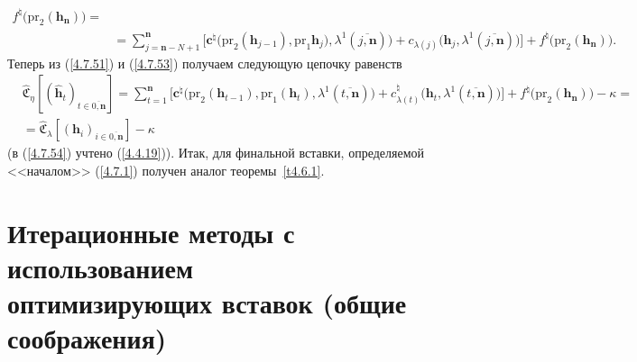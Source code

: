 \documentclass[12pt]{report}
\newcommand{\ov}{\overline}
\newcommand{\la}{\lambda}
\newcommand{\zc}{{\mathbf c}}
\newcommand{\nn}{{\mathbf n}}
\begin{document}
{{\begin{eqnarray}
f^\natural\bigl(\mathrm{pr}_2(\mathbf{h}_\nn)\bigl)=
&\nonumber\\
&= \sum\limits_{j=\nn-N+1}^\nn\bigl[\zc^\natural\bigl(\mathrm{pr}_2(\mathbf{h}_{j-1}),\mathrm{pr}_1
\mathbf{h}_j),\la^1(\ov{j,\nn})\bigl) + c_{\la(j)}\bigl(\mathbf{h}_j,\la^1(\ov{j,\nn})\bigl)\bigl]+
f^\natural\bigl(\mathrm{pr}_2(\mathbf{h}_\nn)\bigl).
&\label{4.7.53}
\end{eqnarray}
Теперь из (\ref{4.7.51}) и (\ref{4.7.53}) получаем следующую цепочку равенств
\begin{eqnarray}
&\widehat{\mathfrak{C}}_\eta[(\hat{\mathbf{h}}_t)_{t\in\ov{0,\nn}}] =
\sum\limits_{t=1}^\nn\bigl[\zc^\natural\bigl(\mathrm{pr}_2(\mathbf{h}_{t-1}),\mathrm{pr}_1
(\mathbf{h}_t),\la^1(\ov{t,\nn})\bigl) + c_{\la(t)}^\natural\bigl(\mathbf{h}_t,
\la^1(\ov{t,\nn})\bigl)\bigl]+ f^\natural\bigl(\mathrm{pr}_2(\mathbf{h}_\nn)\bigl)- \kappa =
&\nonumber\\
&=\widehat{\mathfrak{C}}_\la[(\mathbf{h}_i)_{i\in\ov{0,\nn}}]-\kappa
&\label{4.7.54}
\end{eqnarray}
(в (\ref{4.7.54}) учтено (\ref{4.4.19})). Итак,   для финальной вставки, определяемой <<началом>>
(\ref{4.7.1}) получен аналог теоремы~\ref{t4.6.1}.

\section{Итерационные методы с использованием\\ оптимизирующих вставок (общие соображения)}
\setcounter{equation}{-1}

}}
\end{document}
